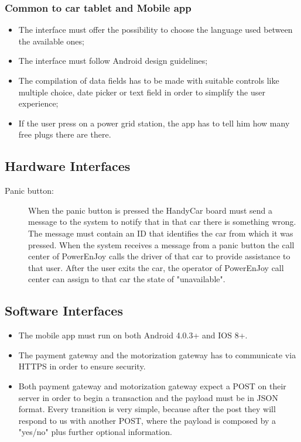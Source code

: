\subsubsection*{Common to car tablet and Mobile app}
	\begin{itemize}
	\item The interface must offer the possibility to choose the language used between the available ones;
	\item The interface must follow Android design guidelines;
	\item The compilation of data fields has to be made with suitable controls like multiple choice, date picker or text field in order to simplify the user experience;
	\item If the user press on a power grid station, the app has to tell him how many free plugs there are there.
	\end{itemize}

\subsection{Hardware Interfaces}
\begin{description}
	\item [Panic button:] When the panic button is pressed the HandyCar board must send a message to the system to notify that in that car there is something wrong. The message must contain an ID that identifies the car from which it was pressed.
	When the system receives a message from a panic button the call center of PowerEnJoy calls the driver of that car to provide assistance to that user. After the user exits the car, the operator of PowerEnJoy call center can assign to that car the state of "unavailable".
\end{description}

\subsection{Software Interfaces}
\begin{itemize}
\item The mobile app must run on both Android 4.0.3+ and IOS 8+.
\item The payment gateway and the motorization gateway has to communicate via HTTPS in order to ensure security.
\item Both payment gateway and motorization gateway expect a POST on their server in order to begin a transaction and the payload must be in JSON format. Every transition is very simple, because after the post they will respond to us with another POST, where the payload is composed by a "yes/no" plus further optional information.
\end{itemize}

